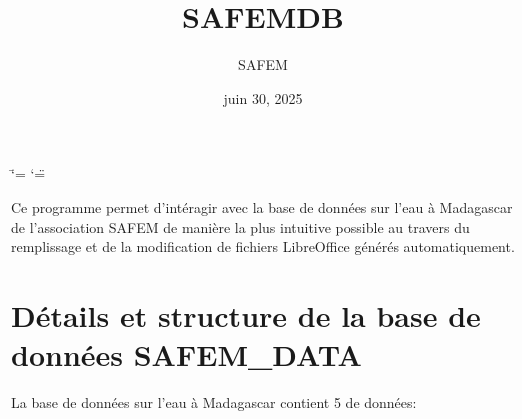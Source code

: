 \documentclass[letterpaper,10pt,french]{sphinxmanual}
\title{SAFE\sphinxhyphen{}M\sphinxhyphen{}DB}
\date{juin 30, 2025}
\author{SAFE\sphinxhyphen{}M}
\begin{document}
\ifdefined\shorthandoff
  \ifnum\catcode`\=\string=\active\shorthandoff{=}\fi
  \ifnum\catcode`\"=\active{}\fi
\fi

\pagestyle{empty}
\sphinxmaketitle
\pagestyle{plain}
\sphinxtableofcontents
\pagestyle{normal}
\label{\detokenize{index::doc}}


\sphinxAtStartPar
Ce programme permet d’intéragir avec la base de données sur l’eau à Madagascar de l’association
SAFE\sphinxhyphen{}M de manière la plus intuitive possible au travers du remplissage et de la modification de fichiers
LibreOffice générés automatiquement.

\sphinxstepscope


\chapter{Détails et structure de la base de données SAFEM\_DATA}
\label{\detokenize{bones:details-et-structure-de-la-base-de-donnees-safem-data}}\label{\detokenize{bones:skeleton}}\label{\detokenize{bones::doc}}
\sphinxAtStartPar
La base de données sur l’eau à Madagascar  contient 5  de données:

\begin{sphinxVerbatim}[commandchars=\\\{\}]
 \PYG{p}{[}\PYG{p}{]}  

  
               
               
          
          
               
\end{sphinxVerbatim}
\end{document}
